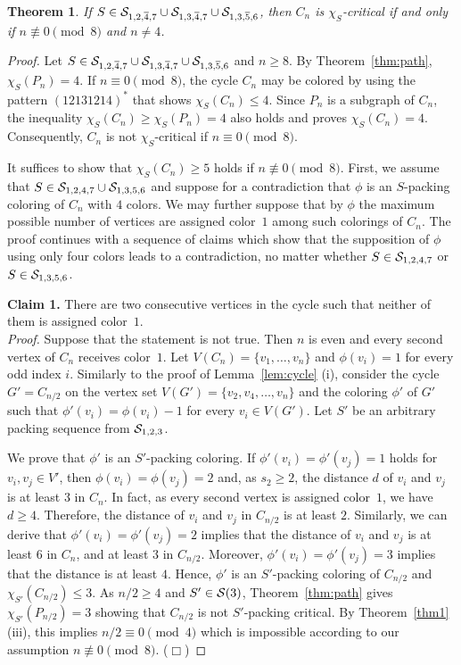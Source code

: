 \documentclass[12pt]{article}
\newtheorem{theorem}{Theorem}[section]
\newcommand{\smallqed}{{\tiny ($\Box$)}}
\newcommand{\cS}{{\cal S}}
\begin{document}
\begin{theorem}  \label{thm-4.3}
      If $S \in \mathcal{S}_{1,2,\overline{4},7} \cup \cS_{1,3,\overline{4},7} \cup \cS_{1,3,\overline{5}, 6}$, then $C_n$ is  $\chi_S$-critical if and only if   $n \not\equiv 0 \pmod{8}$ and $n \neq 4$.  
    \end{theorem}  
     \begin{proof}
    Let $S \in \mathcal{S}_{1,2,\overline{4},7} \cup \cS_{1,3,\overline{4},7} \cup \cS_{1,3,\overline{5}, 6}$ and $n \ge 8$. By Theorem~\ref{thm:path},  $\chi_S(P_n) =4$.
  If $n \equiv 0 \pmod{8}$, the cycle $C_n$ may be colored by using the pattern $(12131214)^*$ that shows $\chi_S(C_n)\le 4$. Since $P_n$ is a subgraph of $C_n$, the inequality $\chi_S(C_n) \ge \chi_S(P_n)=4$ also holds and proves $\chi_S(C_n)=4$. 
   Consequently, $C_n$ is not $\chi_S$-critical if $n \equiv 0 \pmod{8}$.
 \medskip

  It suffices to show that $\chi_S(C_n)\ge 5$ holds if $n \not\equiv 0 \pmod{8}$. First, we assume that $S \in \cS_{1,2,4,7} \cup \cS_{1,3,5,6}$ and suppose for a contradiction that $\phi$ is an $S$-packing coloring of $C_n$ with $4$ colors. We may further suppose that by $\phi$ the maximum possible number of vertices are assigned color~$1$ among such colorings of $C_n$. The proof continues with a sequence of claims which show that the supposition of $\phi$ using only four colors leads to a contradiction, no matter whether $S \in \cS_{1,2,4,7}$ or $S \in \cS_{1,3,5,6}$. 

 \textbf{Claim 1.}   There are two consecutive vertices in the cycle such that neither of them is assigned  color~$1$. \\
 \noindent \textit{Proof.}
 Suppose that the statement is not true. Then $n$ is even and every second vertex of $C_n$ receives color~$1$. Let $V(C_n)= \{v_1, \dots, v_n\}$ and $\phi(v_i)=1$ for every odd index $i$.
  Similarly to the proof of Lemma~\ref{lem:cycle} (i), consider the cycle $G'=C_{n/2}$ on the vertex set $V(G')=\{v_2, v_4, \dots,  v_{n}\}$ and the coloring $\phi'$ of $G'$  such that $\phi'(v_i)=\phi(v_i)-1$ for every  $v_i \in V(G')$. Let $S'$ be an arbitrary packing sequence from $\cS_{1,2,3}$. 
  
  We prove that $\phi'$ is an $S'$-packing coloring. If $\phi'(v_i)=\phi'(v_j)= 1$ holds for $v_i, v_j \in V'$, then $\phi(v_i)=\phi(v_j)=2$ and, as $s_2\ge 2$, the distance $d$ of $v_i$ and $v_j$ is at least $3$ in $C_n$. In fact, as every second vertex is assigned color~$1$, we have $d \ge 4$. Therefore, the distance of $v_i$ and $v_j$ 
   in $C_{n/2}$ is at least $2$. Similarly, we can derive that $\phi'(v_i)=\phi'(v_j)= 2$ implies that the distance  
     of $v_i$ and $v_j$ is at least $6$ in $C_n$, and 
   at least $3$ in $C_{n/2}$. Moreover,  $\phi'(v_i)=\phi'(v_j)= 3$ implies that the distance is at least $4$. Hence, $\phi'$ is an $S'$-packing coloring of $C_{n/2}$ and $\chi_{S'}(C_{n/2}) \leq 3 $. As $n/2 \ge 4$ and $S' \in \cS(3)$, Theorem~\ref{thm:path} gives $\chi_{S'}(P_{n/2})=3$ showing that  $C_{n/2}$ is not $S'$-packing critical. By Theorem~\ref{thm1} (iii), this implies $n/2 \equiv 0 \pmod{4}$ which is impossible according to our assumption $n \not\equiv 0 \pmod{8} $. \smallqed


\end{proof}
\end{document}
